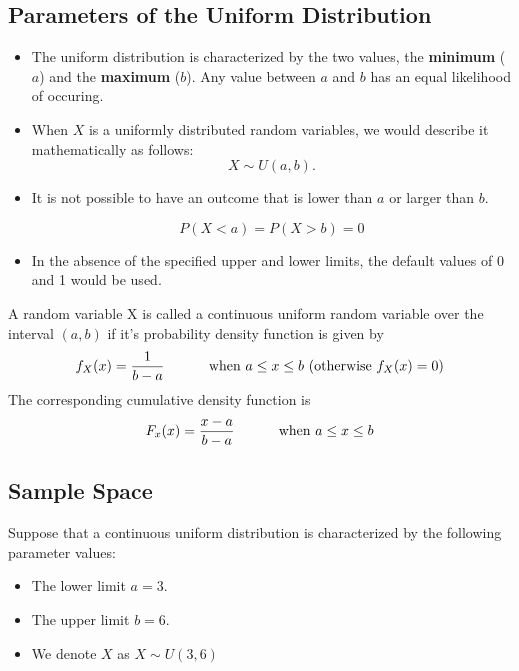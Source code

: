 \documentclass[a4paper,12pt]{article}
\begin{document}
\subsection*{Parameters of the Uniform Distribution}
\begin{itemize}

\item The uniform distribution is characterized by the two values, the \textbf{minimum} ($a$) and the \textbf{maximum} ($b$). Any value between $a$ and $b$ has an equal likelihood of occuring.
\item When $X$ is a uniformly distributed random variables, we would describe it mathematically as follows:
\[ X \sim U(a,b). \]

\item It is not possible to have an outcome that is lower than $a$ or larger than $b$.

\[ P(X < a) = P(X > b) = 0\] 

\item In the absence of the specified upper and lower limits, the default values of 0 and 1 would be used.



\end{itemize}



\begin{framed}
\noindent A random variable X is called a continuous uniform random variable over the interval $(a,b)$ if it's probability density function is given by
\[ f_{X}(x) = { 1 \over b-a} \hspace{1cm} \mbox{ when } a \leq x \leq b \mbox{     (otherwise } f_X(x) = 0 ) \]
The corresponding cumulative density function is
\[ F_x(x) = { x-a \over b-a} \hspace{1cm} \mbox{ when } a \leq x \leq b\]
\end{framed}



\subsection*{Sample Space}
\noindent Suppose that a continuous uniform distribution is characterized by the following parameter values:
\begin{itemize}
\item The lower limit $a = 3$. %

\item The upper limit $b = 6$. %
\item We denote $X$ as $X \sim U(3,6)$
\end{itemize}
\end{document}
